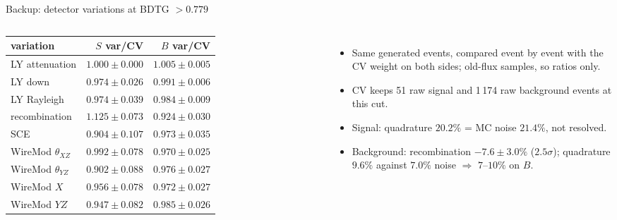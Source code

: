 \documentclass[aspectratio=169,10pt]{beamer}
\begin{document}
\begin{frame}{Backup: detector variations at BDTG $>0.779$}
  \footnotesize
  \begin{columns}[T]
  \begin{tabular}{lrr}
    \toprule
    variation & $S$ var/CV & $B$ var/CV \\
    \midrule
    LY attenuation     & $1.000\pm0.000$ & $1.005\pm0.005$ \\
    LY down            & $0.974\pm0.026$ & $0.991\pm0.006$ \\
    LY Rayleigh        & $0.974\pm0.039$ & $0.984\pm0.009$ \\
    recombination      & $1.125\pm0.073$ & $0.924\pm0.030$ \\
    SCE                & $0.904\pm0.107$ & $0.973\pm0.035$ \\
    WireMod $\theta_{XZ}$ & $0.992\pm0.078$ & $0.970\pm0.025$ \\
    WireMod $\theta_{YZ}$ & $0.902\pm0.088$ & $0.976\pm0.027$ \\
    WireMod $X$        & $0.956\pm0.078$ & $0.972\pm0.027$ \\
    WireMod $YZ$       & $0.947\pm0.082$ & $0.985\pm0.026$ \\
    \bottomrule
  \end{tabular}
  \small
  \begin{itemize}
    \item Same generated events, compared event by event with the CV weight on both sides;
          old-flux samples, so ratios only.
    \item CV keeps 51 raw signal and 1\,174 raw background events at this cut.
    \item Signal: quadrature $20.2\%$ = MC noise $21.4\%$, not resolved.
    \item Background: recombination $-7.6\pm3.0\%$ ($2.5\sigma$); quadrature $9.6\%$
          against $7.0\%$ noise $\Rightarrow$ $7$--$10\%$ on $B$.
  \end{itemize}
  \end{columns}
\end{frame}
\end{document}
